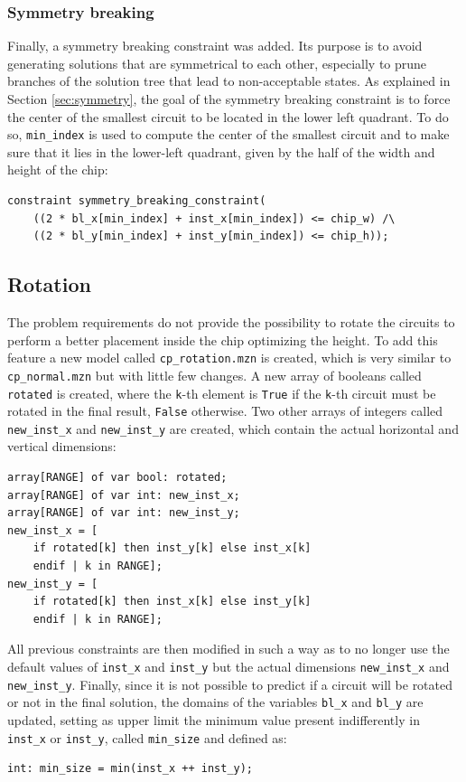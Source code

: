 \documentclass[a4paper, 12pt]{article}
\begin{document}
\subsubsection{Symmetry breaking}

Finally, a symmetry breaking constraint was added. Its purpose is to avoid generating solutions that are symmetrical to each other, especially to prune branches of the solution tree that lead to non-acceptable states. As explained in Section \ref{sec:symmetry}, the goal of the symmetry breaking constraint is to force the center of the smallest circuit to be located in the lower left quadrant. To do so, \verb|min_index| is used to compute the center of the smallest circuit and to make sure that it lies in the lower-left quadrant, given by the half of the width and height of the chip:
\begin{verbatim}
constraint symmetry_breaking_constraint(
    ((2 * bl_x[min_index] + inst_x[min_index]) <= chip_w) /\
    ((2 * bl_y[min_index] + inst_y[min_index]) <= chip_h));
 \end{verbatim}


\subsection{Rotation}
The problem requirements do not provide the possibility to rotate the circuits to perform a better placement inside the chip optimizing the height. To add this feature a new model called \verb|cp_rotation.mzn| is created, which is very similar to \verb|cp_normal.mzn| but with little few changes. A new array of booleans called \verb|rotated| is created, where the \verb|k|-th element is \verb|True| if the \verb|k|-th circuit must be rotated in the final result, \verb|False| otherwise. Two other arrays of integers called \verb|new_inst_x| and \verb|new_inst_y| are created, which contain the actual horizontal and vertical dimensions:
\begin{verbatim}
array[RANGE] of var bool: rotated;
array[RANGE] of var int: new_inst_x;
array[RANGE] of var int: new_inst_y;
new_inst_x = [
    if rotated[k] then inst_y[k] else inst_x[k]
    endif | k in RANGE];
new_inst_y = [
    if rotated[k] then inst_x[k] else inst_y[k]
    endif | k in RANGE];
 \end{verbatim}
 
All previous constraints are then modified in such a way as to no longer use the default values of \verb|inst_x| and \verb|inst_y| but the actual dimensions \verb|new_inst_x| and \verb|new_inst_y|. Finally, since it is not possible to predict if a circuit will be rotated or not in the final solution, the domains of the variables \verb|bl_x| and \verb|bl_y| are updated, setting as upper limit the minimum value present indifferently in \verb|inst_x| or \verb|inst_y|, called \verb|min_size| and defined as:
\begin{verbatim}
int: min_size = min(inst_x ++ inst_y);
 \end{verbatim}
\end{document}

